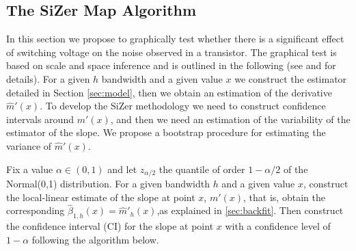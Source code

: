 \documentclass[sn-mathphys]{sn-jnl}%
\theoremstyle{thmstyleone}%
\theoremstyle{thmstyletwo}%
\theoremstyle{thmstylethree}%
\begin{document}
\subsection{The SiZer Map Algorithm}
In this section we propose to graphically test whether there is a significant effect of switching voltage on the noise observed in a transistor. The graphical test is based on scale and space inference and is outlined in the following (see \cite{CM1999} and  \cite{GNR2020} for details). For a given $h$ bandwidth and a given value $x$ we construct the estimator detailed in Section \ref{sec:model}, then we obtain an estimation of the derivative $\widehat{m}'(x)$. To develop the SiZer methodology we need to construct confidence intervals around $m'(x)$, and then we need an estimation of the variability of the estimator of the slope. We propose a bootstrap procedure for estimating the variance of $\widehat{m}'(x)$. \

Fix a value $\alpha \in (0,1)$ and let $z_{\alpha/2}$ the quantile of order $1-\alpha/2$ of the Normal(0,1) distribution. For a given bandwidth $h$ and a given value $x$, construct the local-linear estimate of the slope at point $x$, $m'(x)$, that is, obtain the corresponding $\widehat{\beta}_{1,h}(x)=\widehat{m}'_h(x)$,as explained in \ref{sec:backfit}. Then construct the confidence interval (CI) for the slope at point $x$ with a confidence level of $1-\alpha$ following the algorithm below.
\end{document}
